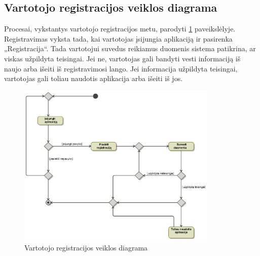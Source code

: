 \documentclass[12pt]{article}
\begin{document}
	\subsection{Vartotojo registracijos veiklos diagrama}
	Procesai, vykstantys vartotojo registracijos metu, parodyti \ref{RegisterActivity} paveikslėlyje. Registravimas vyksta tada, kai vartotojas įsijungia aplikaciją ir pasirenka „Registracija“. Tada vartotojui suvedus reikiamus duomenis sistema patikrina, ar viskas užpildyta teisingai. Jei ne, vartotojas gali bandyti vesti informaciją iš naujo arba išeiti iš registravimosi lango. Jei informacija užpildyta teisingai, vartotojas gali toliau naudotis aplikacija arba išeiti iš jos.
	\begin{figure}[h]
		\begin{center}
			\includegraphics[width=0.85\textwidth]{RegistracijosVeikla.eps}
			\caption{Vartotojo registracijos veiklos diagrama\label{RegisterActivity}}
		\end{center}
	\end{figure}
	
	\pagebreak
	
\end{document}
